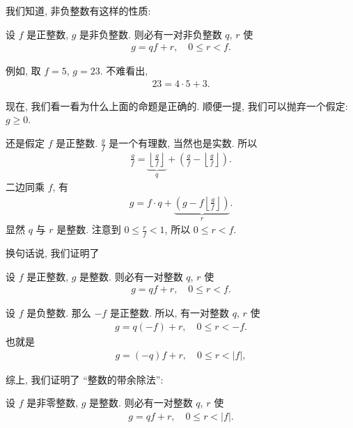 我们知道, 非负整数有这样的性质:

\begin{proposition}
    设 $f$ 是正整数, $g$ 是非负整数. 则必有一对非负整数 $q$, $r$ 使
    \begin{align*}
        g = qf + r, \quad 0 \leq r < f.
    \end{align*}
\end{proposition}

例如, 取 $f=5$, $g=23$. 不难看出,
\begin{align*}
    23 = 4 \cdot 5 + 3.
\end{align*}

现在, 我们看一看为什么上面的命题是正确的. 顺便一提, 我们可以抛弃一个假定: $g \geq 0$.

还是假定 $f$ 是正整数. $\frac{g}{f}$ 是一个有理数, 当然也是实数. 所以
\begin{align*}
    \frac{g}{f} = \underbrace{\left\lfloor \frac{g}{f} \right\rfloor}_{q} + \left( \frac{g}{f} - \left\lfloor \frac{g}{f} \right\rfloor \right).
\end{align*}
二边同乘 $f$, 有
\begin{align*}
    g = f \cdot q + \underbrace{\left( g - f\left\lfloor \frac{g}{f} \right\rfloor \right)}_{r}.
\end{align*}
显然 $q$ 与 $r$ 是整数. 注意到 $0 \leq \frac{r}{f} < 1$, 所以 $0 \leq r < f$.

换句话说, 我们证明了
\begin{proposition}
    设 $f$ 是正整数, $g$ 是整数. 则必有一对整数 $q$, $r$ 使
    \begin{align*}
        g = qf + r, \quad 0 \leq r < f.
    \end{align*}
\end{proposition}

设 $f$ 是负整数. 那么 $-f$ 是正整数. 所以, 有一对整数 $q$, $r$ 使
\begin{align*}
    g = q(-f) + r, \quad 0 \leq r < -f.
\end{align*}
也就是
\begin{align*}
    g = (-q)f + r, \quad 0 \leq r < |f|,
\end{align*}

综上, 我们证明了 ``整数的带余除法'':
\begin{proposition}
    设 $f$ 是非零整数, $g$ 是整数. 则必有一对整数 $q$, $r$ 使
    \begin{align*}
        g = qf + r, \quad 0 \leq r < |f|.
    \end{align*}
\end{proposition}

